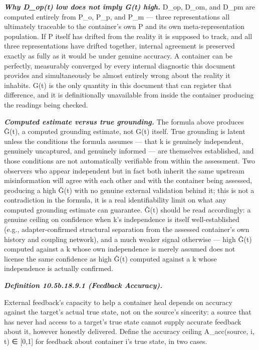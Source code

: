 \documentclass[
]{article}
\begin{document}
\emph{\textbf{Why D\_op(t) low does not imply G(t) high.}} D\_op, D\_om,
and D\_pm are computed entirely from P\_o, P\_p, and P\_m --- three
representations all ultimately traceable to the container's own P and
its own meta-representation population. If P itself has drifted from the
reality it is supposed to track, and all three representations have
drifted together, internal agreement is preserved exactly as fully as it
would be under genuine accuracy. A container can be perfectly,
measurably converged by every internal diagnostic this document provides
and simultaneously be almost entirely wrong about the reality it
inhabits. G(t) is the only quantity in this document that can register
that difference, and it is definitionally unavailable from inside the
container producing the readings being checked.

\emph{\textbf{Computed estimate versus true grounding.}} The formula
above produces Ĝ(t), a computed grounding estimate, not G(t) itself.
True grounding is latent unless the conditions the formula assumes ---
that k is genuinely independent, genuinely uncaptured, and genuinely
informed --- are themselves established, and those conditions are not
automatically verifiable from within the assessment. Two observers who
appear independent but in fact both inherit the same upstream
misinformation will agree with each other and with the container being
assessed, producing a high Ĝ(t) with no genuine external validation
behind it; this is not a contradiction in the formula, it is a real
identifiability limit on what any computed grounding estimate can
guarantee. Ĝ(t) should be read accordingly: a genuine ceiling on
confidence when k's independence is itself well-established (e.g.,
adapter-confirmed structural separation from the assessed container's
own history and coupling network), and a much weaker signal otherwise
--- high Ĝ(t) computed against a k whose own independence is merely
assumed does not license the same confidence as high Ĝ(t) computed
against a k whose independence is actually confirmed.

\emph{\textbf{Definition 10.5b.18.9.1 (Feedback Accuracy).}}

External feedback's capacity to help a container heal depends on
accuracy against the target's actual true state, not on the source's
sincerity: a source that has never had access to a target's true state
cannot supply accurate feedback about it, however honestly delivered.
Define the accuracy ceiling A\_acc(source, i, t) ∈ {[}0,1{]} for
feedback about container i's true state, in two cases.
\end{document}

